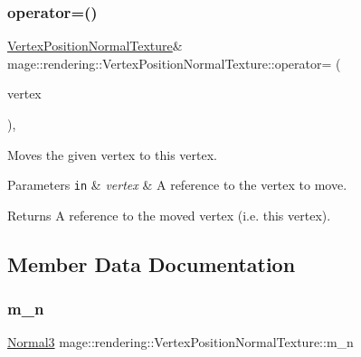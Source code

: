 \subsubsection{\texorpdfstring{operator=()}{operator=()}\hspace{0.1cm}{\footnotesize\ttfamily [2/2]}}
{\footnotesize\ttfamily \mbox{\hyperlink{structmage_1_1rendering_1_1_vertex_position_normal_texture}{Vertex\+Position\+Normal\+Texture}}\& mage\+::rendering\+::\+Vertex\+Position\+Normal\+Texture\+::operator= (\begin{DoxyParamCaption}\item[{\mbox{\hyperlink{structmage_1_1rendering_1_1_vertex_position_normal_texture}{Vertex\+Position\+Normal\+Texture}} \&\&}]{vertex }\end{DoxyParamCaption})\hspace{0.3cm}{\ttfamily [default]}, {\ttfamily [noexcept]}}

Moves the given vertex to this vertex.


\begin{DoxyParams}[1]{Parameters}
\mbox{\tt in}  & {\em vertex} & A reference to the vertex to move. \\
\hline
\end{DoxyParams}
\begin{DoxyReturn}{Returns}
A reference to the moved vertex (i.\+e. this vertex). 
\end{DoxyReturn}


\subsection{Member Data Documentation}
\mbox{\label{structmage_1_1rendering_1_1_vertex_position_normal_texture_a7c800b1234a9291361a21ce2289b1394}} 
\subsubsection{\texorpdfstring{m\+\_\+n}{m\_n}}
{\footnotesize\ttfamily \mbox{\hyperlink{structmage_1_1_normal3}{Normal3}} mage\+::rendering\+::\+Vertex\+Position\+Normal\+Texture\+::m\+\_\+n}

